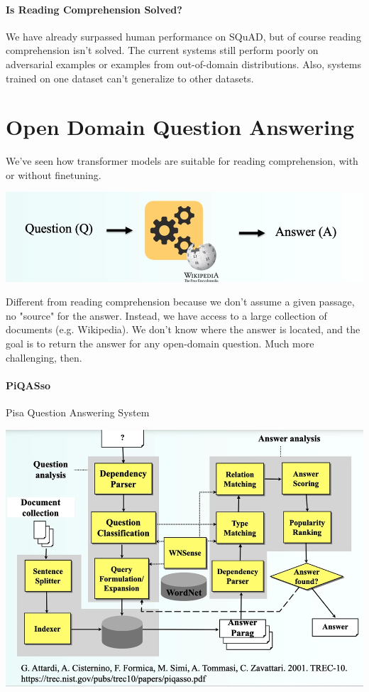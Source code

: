 \documentclass[10pt]{report}
\begin{document}
\paragraph{Is Reading Comprehension Solved?} We have already surpassed human performance on SQuAD, but of course reading comprehension isn't solved. The current systems still perform poorly on adversarial examples or examples from out-of-domain distributions. Also, systems trained on one dataset can't generalize to other datasets.
\section{Open Domain Question Answering}
We've seen how transformer models are suitable for reading comprehension, with or without finetuning.
\begin{center}
	\includegraphics[scale=0.5]{95.png}
\end{center}
Different from reading comprehension because we don't assume a given passage, no "source" for the answer. Instead, we have access to a large collection of documents (e.g. Wikipedia). We don't know where the answer is located, and the goal is to return the answer for any open-domain question. Much more challenging, then.
\paragraph{PiQASso} Pisa Question Answering System
\begin{center}
	\includegraphics[scale=0.5]{96.png}
\end{center}
\end{document}
